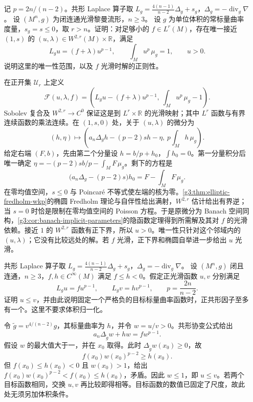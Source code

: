 \begin{exercise}\label{g3:ex:yamabe-implicit-nonpositive}
	记 \(p=2n/(n-2)\)。共形 Laplace 算子取 \(L_g=\tfrac{4(n-1)}{n-2}\Delta_g+s_g\)，\(\Delta_g=-\operatorname{div}_g\nabla\)。
	设 \((M^n,g)\) 为闭连通光滑黎曼流形，\(n\ge3\)。
	设 \(g\) 为单位体积的常标量曲率度量，\(s_g=s\le0\)，取 \(r>n\)。证明：对足够小的 \(f\in L^r(M)\)，存在唯一接近 \((1,s)\) 的 \((u,\lambda)\in W^{2,r}(M)\times\mathbb R\)，满足
	\[
		L_gu=(f+\lambda)u^{p-1},\qquad \int_Mu^p\,\mu_g=1,\qquad u>0.
	\]
	说明这里的唯一性范围，以及 \(f\) 光滑时解的正则性。
\end{exercise}
\begin{solution}
	在正开集 \(\mathcal U_r\) 上定义
	\[
		\mathcal F(u,\lambda,f)=\left(L_gu-(f+\lambda)u^{p-1},\ \int_Mu^p\,\mu_g-1\right).
	\]
	Sobolev 复合及 \(W^{2,r}\to C^0\) 保证这是到 \(L^r\times\mathbb R\) 的光滑映射；其中 \(L^r\) 函数与有界连续函数的乘法连续。在 \((1,s,0)\) 处，关于 \((u,\lambda)\) 的微分为
	\[
		(h,\eta)\longmapsto\left(a_n\Delta_gh-(p-2)sh-\eta,\ p\int_Mh\,\mu_g\right).
	\]
	给定右端 \((F,b)\)，先由第二个分量设 \(h=b/p+h_0\)，\(\int h_0=0\)。第一分量积分后唯一确定
	\(\eta=-(p-2)sb/p-\int_MF\,\mu_g\)。剩下的方程是
	\[
		\bigl(a_n\Delta_g-(p-2)s\bigr)h_0=F-\int_MF\,\mu_g.
	\]
	在零均值空间，\(s\le0\) 与 Poincaré 不等式使左端的核为零。\cref{g3:thm:elliptic-fredholm-wkp}的椭圆 Fredholm 理论与自伴性给出满射，\(W^{2,r}\) 估计给出有界逆；当 \(s=0\) 时恰是限制在零均值空间的 Poisson 方程。于是原微分为 Banach 空间同构，\cref{g3:cor:banach-implicit-parameters}的隐函数定理得到所需解及其对 \(f\) 的光滑依赖。接近 \(1\) 的 \(W^{2,r}\) 函数有正下界，所以 \(u>0\)。唯一性只针对这个邻域内的 \((u,\lambda)\)；它没有比较远处的解。若 \(f\) 光滑，正下界和椭圆自举进一步给出 \(u\) 光滑。
\end{solution}

\begin{exercise}\label{g3:ex:yamabe-negative-prescribed-comparison}
	共形 Laplace 算子取 \(L_g=\tfrac{4(n-1)}{n-2}\Delta_g+s_g\)，\(\Delta_g=-\operatorname{div}_g\nabla\)。
	设 \((M^n,g)\) 闭且连通，\(n\ge3\)，\(f,h\in C^\infty(M)\) 满足 \(f\le h<0\)。假定正光滑函数 \(u,v\) 分别满足
	\[
		L_gu=fu^{p-1},\qquad L_gv=hv^{p-1},
		\qquad p=\frac{2n}{n-2}.
	\]
	证明 \(u\le v\)，并由此说明固定一个严格负的目标标量曲率函数时，正共形因子至多有一个。这里不要求体积归一化。
\end{exercise}
\begin{solution}
	令 \(\widetilde g=v^{4/(n-2)}g\)，其标量曲率为 \(h\)，并令 \(w=u/v>0\)。共形协变公式给出
	\[
		a_n\Delta_{\widetilde g}w+hw=fw^{p-1}.
	\]
	假设 \(w\) 的最大值大于一，并在 \(x_0\) 取得。此时 \(\Delta_{\widetilde g}w(x_0)\ge0\)，故
	\[
		f(x_0)w(x_0)^{p-2}\ge h(x_0).
	\]
	但 \(f(x_0)\le h(x_0)<0\) 且 \(w(x_0)>1\)，给出
	\(f(x_0)w(x_0)^{p-2}<f(x_0)\le h(x_0)\)，矛盾。因此 \(w\le1\)，即 \(u\le v\)。若两个目标函数相同，交换 \(u,v\) 再比较即得相等。目标函数的数值已固定了尺度，故此处无须另加体积条件。
\end{solution}

